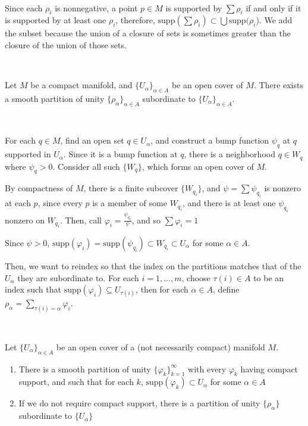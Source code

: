 \documentclass{article}
\begin{document}
\begin{customproof}
  \

  Since each $\rho_i$ is nonnegative, a point $p \in M$ is supported by $\sum \rho_i$ if and only if it is supported by at least one $\rho_i$, therefore, $\text{supp}(\sum \rho_i) \subset \bigcup \text{supp}( \rho_i$). We add the subset because the union of a closure of sets is sometimes greater than the closure of the union of those sets.
\end{customproof}

\begin{proposition}
  \

  Let $M$ be a compact manifold, and $\{U_\alpha\}_{\alpha \in A}$ be an open cover of $M$. There exists a smooth partition of unity $\{\rho_\alpha\}_{\alpha \in A}$ subordinate to $\{U_\alpha\}_{\alpha \in A}$.
\end{proposition}

\begin{customproof}
  \

  For each $q \in M$, find an open set $q \in U_\alpha$, and construct a bump function $\psi_q$ at $q$ supported in $U_\alpha$. Since it is a bump function at $q$, there is a neighborhood $q \in W_q$ where $\psi_q > 0$. Consider all such $\{W_q\}$, which forms an open cover of $M$.

  By compactness of $M$, there is a finite subcover $\{W_{q_i}\}$, and $\psi = \sum \psi_{q_i}$ is nonzero at each $p$, since every $p$ is a member of some $W_{q_i}$, and there is at least one $\psi_{q_i}$ nonzero on $W_{q_i}$. Then, call $\varphi_i = \frac{\psi_{q_i}}{\psi}$, and so $\sum \varphi_i = 1$

  Since $\psi > 0$, $\text{supp}(\varphi_i) = \text{supp}(\psi_{q_i}) \subset W_{q_i} \subset U_\alpha$ for some $\alpha \in A$.

  Then, we want to reindex so that the index on the partitions matches that of the $U_\alpha$ they are subordinate to. For each $i = 1, \dots, m$, choose $\tau(i) \in A$ to be an index such that $\text{supp}(\varphi_i) \subseteq U_{\tau(i)}$, then for each $\alpha \in A$, define $\rho_\alpha = \sum_{\tau(i) = \alpha} \varphi_i$.
\end{customproof}

\begin{theorem}
  \

  Let $\{U_\alpha\}_{\alpha \in A}$ be an open cover of a (not necessarily compact) manifold $M$.
  \begin{enumerate}
    \item There is a smooth partition of unity $\{\varphi_k\}_{k = 1}^\infty$ with every $\varphi_k$ having compact support, and such that for each $k$, $\text{supp}(\varphi_k) \subset U_\alpha$ for some $\alpha \in A$
    \item If we do not require compact support, there is a partition of unity $\{\rho_\alpha\}$ subordinate to $\{U_\alpha\}$
  \end{enumerate}
\end{theorem}
\end{document}
